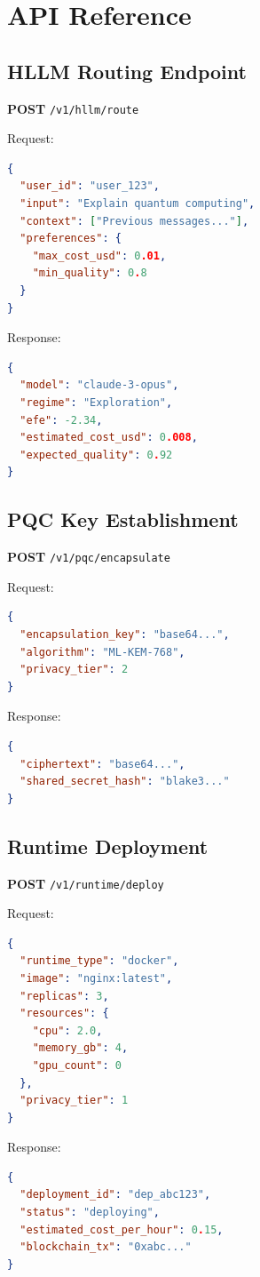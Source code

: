 \section{API Reference}


\subsection{HLLM Routing Endpoint}

\textbf{POST} \texttt{/v1/hllm/route}

Request:
\begin{lstlisting}[language=json]
{
  "user_id": "user_123",
  "input": "Explain quantum computing",
  "context": ["Previous messages..."],
  "preferences": {
    "max_cost_usd": 0.01,
    "min_quality": 0.8
  }
}
\end{lstlisting}

Response:
\begin{lstlisting}[language=json]
{
  "model": "claude-3-opus",
  "regime": "Exploration",
  "efe": -2.34,
  "estimated_cost_usd": 0.008,
  "expected_quality": 0.92
}
\end{lstlisting}

\subsection{PQC Key Establishment}

\textbf{POST} \texttt{/v1/pqc/encapsulate}

Request:
\begin{lstlisting}[language=json]
{
  "encapsulation_key": "base64...",
  "algorithm": "ML-KEM-768",
  "privacy_tier": 2
}
\end{lstlisting}

Response:
\begin{lstlisting}[language=json]
{
  "ciphertext": "base64...",
  "shared_secret_hash": "blake3..."
}
\end{lstlisting}

\subsection{Runtime Deployment}

\textbf{POST} \texttt{/v1/runtime/deploy}

Request:
\begin{lstlisting}[language=json]
{
  "runtime_type": "docker",
  "image": "nginx:latest",
  "replicas": 3,
  "resources": {
    "cpu": 2.0,
    "memory_gb": 4,
    "gpu_count": 0
  },
  "privacy_tier": 1
}
\end{lstlisting}

Response:
\begin{lstlisting}[language=json]
{
  "deployment_id": "dep_abc123",
  "status": "deploying",
  "estimated_cost_per_hour": 0.15,
  "blockchain_tx": "0xabc..."
}
\end{lstlisting}

